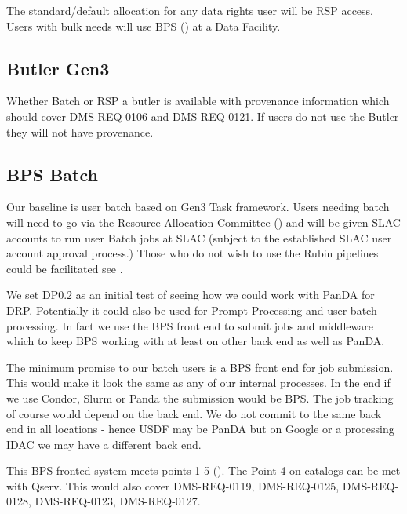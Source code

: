 The standard/default allocation for any data rights user will be RSP access.
Users with bulk needs will use BPS () at a Data Facility.


\subsection{Butler Gen3} \label{sec:gen3}

Whether Batch or RSP a butler is available with provenance information which should cover DMS-REQ-0106 and DMS-REQ-0121.
If users do not use the Butler they will not have provenance.

\subsection{BPS Batch }\label{sec:bpsbatch}

Our baseline is user batch based on Gen3 Task framework.
Users needing batch will need to go via the Resource Allocation Committee () and
will be given SLAC accounts to run user Batch jobs at SLAC (subject to the established SLAC user account approval process.)
Those who do not wish to use the Rubin pipelines could be facilitated see .


We set DP0.2 as an initial test of seeing how we could work with PanDA 
for DRP. Potentially it could also be used for Prompt Processing and user batch processing.
In fact we use the BPS front end to submit jobs and middleware which to keep BPS working with at least on other back end as well as PanDA.

The minimum promise to our batch users is a BPS front end for job submission.
This would make it look the same as any of our internal processes.
In the end if we use Condor, Slurm or Panda the submission would be BPS.
The job tracking of course would depend on the back end.
We do not commit to the same back end in all locations - hence USDF may be PanDA but on Google or a processing IDAC we may have a different back end.

This BPS fronted system meets  points 1-5 (). The Point 4 on catalogs can be met with Qserv.
This would also cover DMS-REQ-0119, DMS-REQ-0125, DMS-REQ-0128, DMS-REQ-0123, DMS-REQ-0127.

